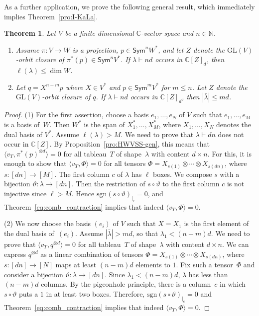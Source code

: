 \documentclass[11pt]{amsart}
\def\N{\mathbb{N}}
\def\C{\mathbb{C}}
\def\sgn{\mathrm{sgn}}
\def\GL{\mathrm{GL}}
\def\Sym{\mathsf{Sym}}
\def\la{\lambda}
\def\ot{\otimes}
\newcommand{\IC}{\ensuremath{\mathbb{C}}}
\numberwithin{equation}{section}
\newtheorem{theorem}{Theorem}[section]
\begin{document}
As a further application, we prove the following general result, which immediately
implies Theorem~\ref{pro:I-KaLa}.

\begin{theorem}\label{thm:KaLaG}
Let $V$ be a finite dimensional $\C$-vector space and $n\in\N$. 
\begin{enumerate}
\item Assume $\pi\colon V\to W$ is a projection,  
$p\in\Sym^n W^*$, and let $Z$ denote the $\GL(V)$-orbit closure of $\pi^*(p)\in\Sym^n V^*$. 
If $\la\vdash nd$ occurs in $\IC[Z]_d$, then $\ell(\la)\leq \dim W$.

\item Let $q=X^{n-m}p$ where $X\in V^*$ and $p\in\Sym^mV^*$ for $m\le n$.
Let $Z$ denote the $\GL(V)$-orbit closure of $q$. 
If $\la\vdash nd$ occurs in $\IC[Z]_d$, then $|\bar\la|\leq md$. 
\end{enumerate}
\end{theorem}

\begin{proof}
(1) For the first assertion, choose a basis $e_1,\ldots,e_N$ of $V$ such that $e_1,\ldots,e_M$ is a basis of~$W$. 
Then $W^*$ is the span of $X_1^*,\ldots,X_M^*$, where $X_1,\ldots,X_N$ denotes the dual basis of $V^*$. 
Assume $\ell(\la) > M$. We need to prove that $\la\vdash dn$ does not occur in $\C[Z]$. 
By Proposition~\ref{pro:HWVSS-gen}, this means that 
$\langle v_T, \pi^*(p)^{\ot d} \rangle = 0$
for all tableau~$T$ of shape~$\la$ with content $d\times n$.
For this, it is enough to show that $\langle v_T, \Phi\rangle =0$ for all tensors 
$\Phi=X_{s(1)}\otimes\cdots\otimes X_{s(dn)}$, where 
$s\colon [dn] \to [M]$.
The first column $c$ of $\la$ has $\ell$ boxes. 
We compose $s$ with a bijection $\vartheta\colon\la \to [dn]$.
Then the restriction of 
$s\circ\vartheta$ to the first column $c$ 
is not injective since $\ell>M$. 
Hence $\sgn (s\circ\vartheta)_{|_c} =0$, 
and Theorem~\ref{eq:comb_contraction} implies that indeed 
$\langle v_T, \Phi\rangle =0$.

(2) We now choose the basis $(e_i)$ of $V$ such that $X=X_1$ is 
the first element of the dual basis of~$(e_i)$. 
Assume $|\bar\la|>md$, so that $\la_1 < (n-m)d$. 
We need to prove that 
$\langle v_T, q^{\ot d} \rangle = 0$
for all tableau~$T$ of shape~$\la$ with content $d\times n$.
We can express $q^{\otimes d}$ as a linear combination of tensors
$\Phi=X_{s(1)}\otimes\cdots\otimes X_{s(dn)}$, where 
$s\colon[dn]\to [N]$ maps at least $(n-m)d$ elements to $1$.
Fix such a tensor~$\Phi$ and consider a bijection $\vartheta\colon\la\to [dn]$.  
Since $\la_1 < (n-m)d$, $\la$ has less than $(n-m)d$ columns. 
By the pigeonhole principle, there is a column~$c$ 
in which $s\circ\vartheta$ puts a $1$ in at least two boxes. 
Therefore, $\sgn (s\circ\vartheta)_{|_c} =0$ and 
Theorem~\ref{eq:comb_contraction} implies that indeed
$\langle v_T, \Phi\rangle =0$.


\end{proof}
\end{document}
